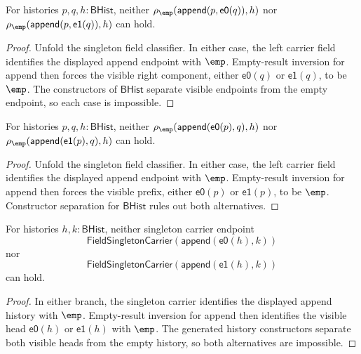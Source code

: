 \begin{theorem}
\label{thm:field-singleton-classifier-append-visible-left-absurd}
For histories $p,q,h:\mathsf{BHist}$, neither
$\rho_{\emp}(\mathsf{append}(p,\mathsf{e0}(q)),h)$ nor
$\rho_{\emp}(\mathsf{append}(p,\mathsf{e1}(q)),h)$ can hold.
\end{theorem}
\begin{proof}
Unfold the singleton field classifier. In either case, the left carrier field
identifies the displayed append endpoint with $\emp$. Empty-result inversion
for append then forces the visible right component, either $\mathsf{e0}(q)$ or
$\mathsf{e1}(q)$, to be $\emp$. The constructors of $\mathsf{BHist}$ separate
visible endpoints from the empty endpoint, so each case is impossible.
\end{proof}

\begin{theorem}
\label{thm:field-singleton-classifier-append-visible-prefix-absurd}
For histories $p,q,h:\mathsf{BHist}$, neither
$\rho_{\emp}(\mathsf{append}(\mathsf{e0}(p),q),h)$ nor
$\rho_{\emp}(\mathsf{append}(\mathsf{e1}(p),q),h)$ can hold.
\end{theorem}
\begin{proof}
Unfold the singleton field classifier. In either case, the left carrier field
identifies the displayed append endpoint with $\emp$. Empty-result inversion
for append then forces the visible prefix, either $\mathsf{e0}(p)$ or
$\mathsf{e1}(p)$, to be $\emp$. Constructor separation for
$\mathsf{BHist}$ rules out both alternatives.
\end{proof}

\begin{theorem}
\label{thm:field-singleton-carrier-append-visible-head-absurd}
For histories $h,k:\mathsf{BHist}$, neither singleton carrier endpoint
$$
\mathsf{FieldSingletonCarrier}(\mathsf{append}(\mathsf{e0}(h),k))
$$
nor
$$
\mathsf{FieldSingletonCarrier}(\mathsf{append}(\mathsf{e1}(h),k))
$$
can hold.
\end{theorem}
\begin{proof}
In either branch, the singleton carrier identifies the displayed append
history with $\emp$. Empty-result inversion for append then identifies the
visible head $\mathsf{e0}(h)$ or $\mathsf{e1}(h)$ with $\emp$. The generated
history constructors separate both visible heads from the empty history, so
both alternatives are impossible.
\end{proof}


